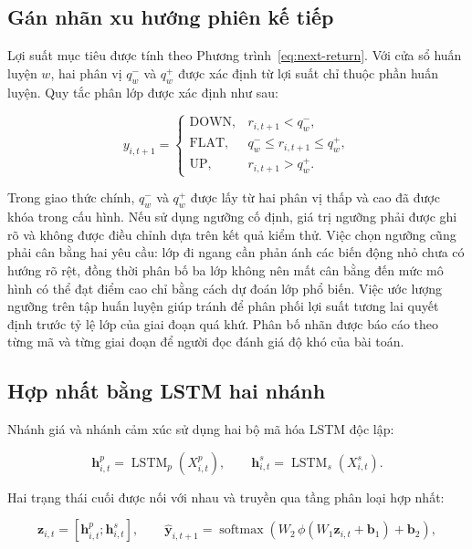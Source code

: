 \documentclass[12pt, a4paper, oneside]{report}
\begin{document}
\subsection{Gán nhãn xu hướng phiên kế tiếp}

Lợi suất mục tiêu được tính theo Phương trình~\ref{eq:next-return}. Với cửa sổ huấn luyện $w$, hai phân vị $q^-_w$ và $q^+_w$ được xác định từ lợi suất chỉ thuộc phần huấn luyện. Quy tắc phân lớp được xác định như sau:

\begin{equation}
 y_{i,t+1}=\begin{cases}
 \mathrm{DOWN}, & r_{i,t+1}<q^-_w,\\
 \mathrm{FLAT}, & q^-_w\leq r_{i,t+1}\leq q^+_w,\\
 \mathrm{UP}, & r_{i,t+1}>q^+_w.
 \end{cases}
 \label{eq:trend-label}
\end{equation}

Trong giao thức chính, $q^-_w$ và $q^+_w$ được lấy từ hai phân vị thấp và cao đã được khóa trong cấu hình. Nếu sử dụng ngưỡng cố định, giá trị ngưỡng phải được ghi rõ và không được điều chỉnh dựa trên kết quả kiểm thử. Việc chọn ngưỡng cũng phải cân bằng hai yêu cầu: lớp đi ngang cần phản ánh các biến động nhỏ chưa có hướng rõ rệt, đồng thời phân bố ba lớp không nên mất cân bằng đến mức mô hình có thể đạt điểm cao chỉ bằng cách dự đoán lớp phổ biến. Việc ước lượng ngưỡng trên tập huấn luyện giúp tránh để phân phối lợi suất tương lai quyết định trước tỷ lệ lớp của giai đoạn quá khứ. Phân bố nhãn được báo cáo theo từng mã và từng giai đoạn để người đọc đánh giá độ khó của bài toán.

\subsection{Hợp nhất bằng LSTM hai nhánh}

Nhánh giá và nhánh cảm xúc sử dụng hai bộ mã hóa LSTM độc lập:

\begin{equation}
  \mathbf{h}^{p}_{i,t}=\operatorname{LSTM}_{p}(X^{p}_{i,t}),
  \qquad
  \mathbf{h}^{s}_{i,t}=\operatorname{LSTM}_{s}(X^{s}_{i,t}).
  \label{eq:two-branch-encoders}
\end{equation}

Hai trạng thái cuối được nối với nhau và truyền qua tầng phân loại hợp nhất:

\begin{equation}
  \mathbf{z}_{i,t}=\left[\mathbf{h}^{p}_{i,t};\mathbf{h}^{s}_{i,t}\right],
  \qquad
  \hat{\mathbf{y}}_{i,t+1}=\operatorname{softmax}
  \left(W_2\,\phi(W_1\mathbf{z}_{i,t}+\mathbf{b}_1)+\mathbf{b}_2\right),
  \label{eq:fusion-classifier}
\end{equation}
\end{document}
